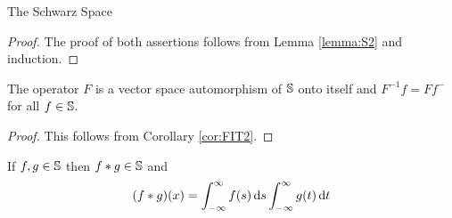 \begin{section}{The Schwarz Space}
\begin{proof}
	The proof of both assertions follows from Lemma \ref{lemma:S2}
	and induction.
\end{proof}


\begin{thrm}\label{thrm:FisAutomorphism}
	The operator $F$ is a vector space automorphism of $\mathbb{S}$
	onto itself and $F^{-1}f=Ff^-$ for all $f \in \mathbb{S}$.
\end{thrm}

\begin{proof}
	This follows from Corollary \ref{cor:FIT2}.
\end{proof}


\begin{prop}
	If $f,g \in \mathbb{S}$ then ${f} \ast {g} \in \mathbb{S}$
	and
		\begin{displaymath}
			({f} \ast {g})(x) = \int_{-\infty}^{\infty}{f(s)}\, \mathrm{d}{s}\int_{-\infty}^{\infty}{g(t)}\, \mathrm{d}{t}
		\end{displaymath}
\end{prop}


\end{section}
